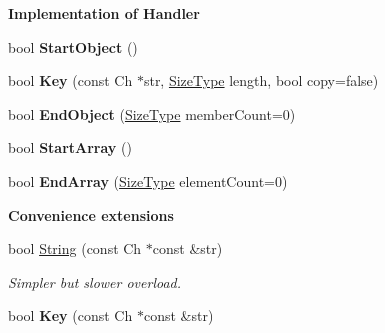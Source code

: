 \begin{Indent}{\bf Implementation of Handler}
\begin{DoxyCompactItemize}
\item 
bool {\bfseries Start\+Object} ()\hypertarget{classWriter_aec3200b2fc80ec87d1c37f775256b2e1}{}\label{classWriter_aec3200b2fc80ec87d1c37f775256b2e1}

\item 
bool {\bfseries Key} (const Ch $\ast$str, \hyperlink{rapidjson_8h_a5ed6e6e67250fadbd041127e6386dcb5}{Size\+Type} length, bool copy=false)\hypertarget{classWriter_a19096d2ccb90761f63ab1240337bf90a}{}\label{classWriter_a19096d2ccb90761f63ab1240337bf90a}

\item 
bool {\bfseries End\+Object} (\hyperlink{rapidjson_8h_a5ed6e6e67250fadbd041127e6386dcb5}{Size\+Type} member\+Count=0)\hypertarget{classWriter_a0771a565261564c27676b7300b11f2b5}{}\label{classWriter_a0771a565261564c27676b7300b11f2b5}

\item 
bool {\bfseries Start\+Array} ()\hypertarget{classWriter_a38715785194b42cd67ba5dd52bf7967e}{}\label{classWriter_a38715785194b42cd67ba5dd52bf7967e}

\item 
bool {\bfseries End\+Array} (\hyperlink{rapidjson_8h_a5ed6e6e67250fadbd041127e6386dcb5}{Size\+Type} element\+Count=0)\hypertarget{classWriter_ac88d533095591a878500b63b351d4013}{}\label{classWriter_ac88d533095591a878500b63b351d4013}

\end{DoxyCompactItemize}
\end{Indent}
\begin{Indent}{\bf Convenience extensions}\par
\begin{DoxyCompactItemize}
\item 
bool \hyperlink{classWriter_a2a2c6f51644b2013471aec4dac0d7466}{String} (const Ch $\ast$const \&str)\hypertarget{classWriter_a2a2c6f51644b2013471aec4dac0d7466}{}\label{classWriter_a2a2c6f51644b2013471aec4dac0d7466}

\begin{DoxyCompactList}\small\item\em Simpler but slower overload. \end{DoxyCompactList}\item 
bool {\bfseries Key} (const Ch $\ast$const \&str)\hypertarget{classWriter_ab6057b7fa9737edb4da55a7afefa966d}{}\label{classWriter_ab6057b7fa9737edb4da55a7afefa966d}

\end{DoxyCompactItemize}
\end{Indent}
